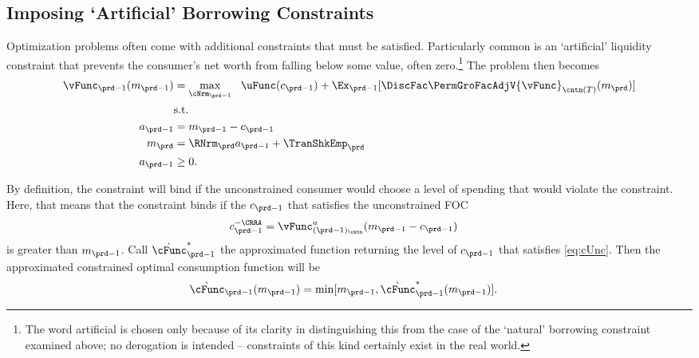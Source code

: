 \subsection{Imposing `Artificial' Borrowing Constraints}

Optimization problems often come with additional constraints that must
be satisfied.  Particularly common is an `artificial' liquidity constraint that
prevents the consumer's net worth from falling below some value, often
zero.\footnote{The word artificial is chosen only because of its clarity in distinguishing
  this from the case of the `natural' borrowing constraint examined above; no derogation is
  intended -- constraints of this kind certainly exist in the real world.}  The problem then becomes
\begin{equation*}\begin{gathered}\begin{aligned}
      \vFunc_{\prd-1}(m_{\prd-1})  & = \max_{\cNrm_{\prd-1}} ~~ \uFunc(c_{\prd-1}) + \Ex_{\prd-1} [\DiscFac \PermGroFacAdjV{\vFunc}_{\cntn(T)}(m_{\prd})] \label{eq:ConstrArt}
      \\ & \mbox{s.t.}  \nonumber
      \\ a_{\prd-1}  & = m_{\prd-1} - c_{\prd-1}
      \\ m_{\prd}  & = \RNrm_{\prd} a_{\prd-1} + \TranShkEmp_{\prd}
      \\ a_{\prd-1} & \geq 0 .
    \end{aligned}\end{gathered}\end{equation*}


By definition, the constraint will bind if the unconstrained consumer
would choose a level of spending that would violate the constraint.
Here, that means that the constraint binds if the $c_{\prd-1}$
that satisfies the unconstrained FOC
\begin{equation}\begin{gathered}\begin{aligned}
      c_{\prd-1}^{-\CRRA}  & = \vFunc^{a}_{({\prd-1})_\cntn}(m_{\prd-1}-c_{\prd-1}) \label{eq:cUnc}
    \end{aligned}\end{gathered}\end{equation}
is greater than $m_{\prd-1}$.  Call $\grave{\cFunc}^{\ast}_{\prd-1}$ the approximated function
returning the level of $c_{\prd-1}$ that satisfies \eqref{eq:cUnc}.
Then the approximated constrained optimal consumption function will be
  \begin{equation}\begin{gathered}\begin{aligned}
        \grave{\cFunc}_{\prd-1}(m_{\prd-1})  & = \min[{m}_{\prd-1},\grave{\cFunc}^{\ast}_{\prd-1}(m_{\prd-1})] \label{eq:LiqCons}.
      \end{aligned}\end{gathered}\end{equation}

